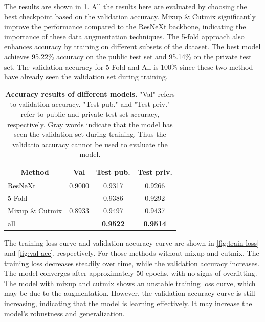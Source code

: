 \documentclass[10pt,twocolumn,letterpaper]{article}
\begin{document}
The results are shown in \cref{tab:result}. All the results here are evaluated
by choosing the best checkpoint based on the validation accuracy. Mixup \& Cutmix
significantly improve the performance compared to the ResNeXt backbone, indicating
the importance of these data augmentation techniques. The 5-fold approach also
enhances accuracy by training on different subsets of the dataset. The best model
achieves 95.22\% accuracy on the public test set and 95.14\% on the
private test set. The validation accuracy for 5-Fold and All is 100\% since
these two method have already seen the validation set during training.

\begin{table}[h]
  \centering
  \begin{tabular}{lccc}
    \toprule
    \multicolumn{1}{c}{\textbf{Method}} & \textbf{Val}                  & \textbf{Test pub.} & \textbf{Test priv.} \\
    \midrule
    ResNeXt                             & 0.9000                        & 0.9317             & 0.9266              \\
    5-Fold                              & \color[rgb]{.6,.6,.6}{1.0000} & 0.9386             & 0.9292              \\
    Mixup \& Cutmix                     & 0.8933                        & 0.9497             & 0.9437              \\
    all                                 & \color[rgb]{.6,.6,.6}{1.0000} & \textbf{0.9522}    & \textbf{0.9514}     \\
    \bottomrule
  \end{tabular}
  \caption{\textbf{Accuracy results of different models.} "Val" refers to 
    validation accuracy. "Test pub." and "Test priv." refer to public and
    private test set accuracy, respectively. Gray words indicate that the
    model has seen the validation set during training. Thus the validatio
    accuracy cannot be used to evaluate the model.
  }
  \label{tab:result}
\end{table}

The training loss curve and validation accuracy curve are shown in \cref{fig:train-loss}
and \cref{fig:val-acc}, respectively. For those methods without mixup and
cutmix. The training loss decreases steadily over time, while the validation
accuracy increases. The model converges after approximately 50 epochs,
with no signs of overfitting. The model with mixup and cutmix shows an
unstable training loss curve, which may be due to the augmentation. However,
the validation accuracy curve is still increasing, indicating that the model
is learning effectively. It may increase the model’s robustness and
generalization.
\end{document}
